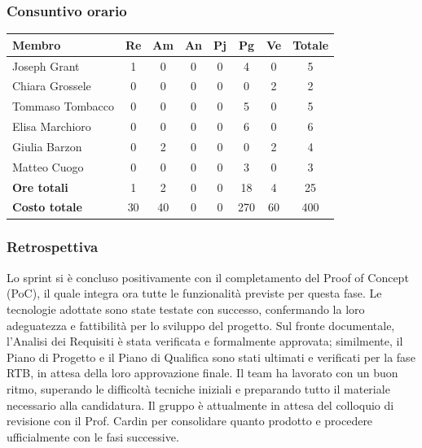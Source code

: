 \documentclass[11pt,a4paper]{article}
\begin{document}
\subsubsection{Consuntivo orario}
\begin{center}
    \begin{tabular}{|l|c|c|c|c|c|c|c|}
        \hline
        \textbf{Membro} & \textbf{Re} & \textbf{Am} & \textbf{An} & \textbf{Pj} & \textbf{Pg} & \textbf{Ve} & \textbf{Totale} \\
        \hline
        Joseph Grant & 1 & 0 & 0 & 0 & 4 & 0 & 5 \\
        \hline
        Chiara Grossele & 0 & 0 & 0 & 0 & 0 & 2 & 2 \\
        \hline
        Tommaso Tombacco & 0 & 0 & 0 & 0 & 5 & 0 & 5 \\
        \hline
        Elisa Marchioro & 0 & 0 & 0 & 0 & 6 & 0 & 6 \\
        \hline
        Giulia Barzon & 0 & 2 & 0 & 0 & 0 & 2 & 4 \\
        \hline
        Matteo Cuogo & 0 & 0 & 0 & 0 & 3 & 0 & 3 \\
        \hline
        \textbf{Ore totali} & 1 & 2 & 0 & 0 & 18 & 4 & 25 \\
        \hline
        \textbf{Costo totale} & 30 & 40 & 0 & 0 & 270 & 60 & 400 \\
        \hline
    \end{tabular}
\end{center}

\subsubsection{Retrospettiva}
Lo sprint si è concluso positivamente con il completamento del Proof of Concept (PoC), il quale integra ora tutte le funzionalità previste per questa fase. Le tecnologie adottate sono state testate con successo, confermando la loro adeguatezza e fattibilità per lo sviluppo del progetto. Sul fronte documentale, l'Analisi dei Requisiti è stata verificata e formalmente approvata; similmente, il Piano di Progetto e il Piano di Qualifica sono stati ultimati e verificati per la fase RTB, in attesa della loro approvazione finale. Il team ha lavorato con un buon ritmo, superando le difficoltà tecniche iniziali e preparando tutto il materiale necessario alla candidatura. Il gruppo è attualmente in attesa del colloquio di revisione con il Prof. Cardin per consolidare quanto prodotto e procedere ufficialmente con le fasi successive.
\end{document}
